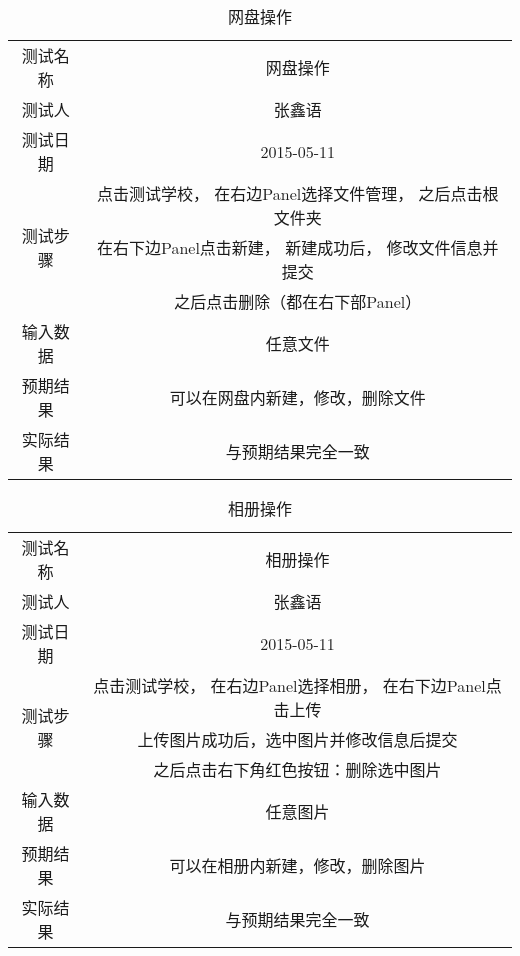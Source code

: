 \begin{table}[H]
  \centering
  \caption{网盘操作}
  \label{tab:5}
  \begin{tabular}{cc}
    \toprule
    测试名称 & 网盘操作  \\

    测试人 & 张鑫语 \\
    测试日期 & 2015-05-11 \\

    \midrule
    \multirow{3}{*}{测试步骤} 		& 点击测试学校， 在右边Panel选择文件管理， 之后点击根文件夹 \\
             & 在右下边Panel点击新建， 新建成功后， 修改文件信息并提交 \\
             & 之后点击删除（都在右下部Panel） \\

    \midrule
    输入数据 		& 任意文件 \\
    预期结果 		& 可以在网盘内新建，修改，删除文件 \\
    实际结果             & 与预期结果完全一致 \\
    \bottomrule
  \end{tabular}
\end{table}


\begin{table}[H]
  \centering
  \caption{相册操作}
  \label{tab:6}
  \begin{tabular}{cc}
    \toprule
    测试名称 & 相册操作  \\

    测试人 & 张鑫语 \\
    测试日期 & 2015-05-11 \\

    \midrule
    \multirow{3}{*}{测试步骤} 		& 点击测试学校， 在右边Panel选择相册， 在右下边Panel点击上传 \\
             & 上传图片成功后，选中图片并修改信息后提交 \\
             &之后点击右下角红色按钮：删除选中图片 \\

    \midrule
    输入数据 		& 任意图片 \\
    预期结果 		& 可以在相册内新建，修改，删除图片 \\
    实际结果             & 与预期结果完全一致 \\
    \bottomrule
  \end{tabular}
\end{table}


